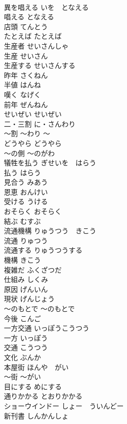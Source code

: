 \documentclass[8pt]{extreport}
\begin{document}
\begin{CJK}{UTF8}{min}
\\	異を唱える	いを　となえる	
\\	唱える	となえる	
\\	店頭	てんとう	
\\	たとえば	たとえば	
\\	生産者	せいさんしゃ	
\\	生産	せいさん	
\\	生産する	せいさんする	
\\	昨年	さくねん	
\\	半値	はんね	
\\	嘆く	なげく	
\\	前年	ぜんねん	
\\	せいぜい	せいぜい	
\\	二・三割	に・さんわり	
\\	〜割	〜わり	〜
\\	どうやら	どうやら	
\\	〜の側	〜のがわ	
\\	犠牲を払う	ぎせいを　はらう	
\\	払う	はらう	
\\	見合う	みあう	
\\	恩恵	おんけい	
\\	受ける	うける	
\\	おそらく	おそらく	
\\	結ぶ	むすぶ	
\\	流通機構	りゅうつう　きこう	
\\	流通	りゅつう	
\\	流通する	りゅうつうする	
\\	機構	きこう	
\\	複雑だ	ふくざつだ	
\\	仕組み	しくみ	
\\	原因	げんいん	
\\	現状	げんじょう	
\\	〜のもとで	〜のもとで	
\\	今後	こんご	
\\	一方交通	いっぽうこうつう	
\\	一方	いっぽう	
\\	交通	こうつう	
\\	文化	ぶんか	
\\	本屋街	ほんや　がい	
\\	〜街	〜がい	
\\	目にする	めにする	
\\	通りかかる	とおりかかる	
\\	ショーウインドー	しょー　ういんどー	
\\	新刊書	しんかんしょ	

\end{CJK}
\end{document}
